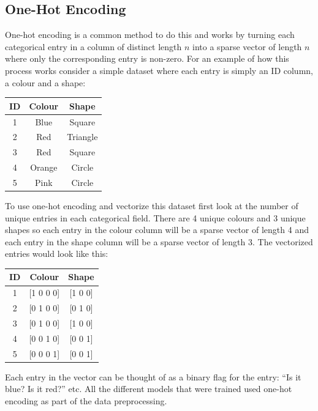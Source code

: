 \documentclass[a4paper,11pt]{article}
\begin{document}
\subsection{One-Hot Encoding}
One-hot encoding is a common method to do this and works by turning each categorical entry in a column of distinct length $n$ into a sparse vector of length $n$ where only the corresponding entry is non-zero. For an example of how this process works consider a simple dataset where each entry is simply an ID column, a colour and a shape:
\begin{center}
\begin{tabular}{ |c|c|c| } 
 \hline
 ID & Colour & Shape \\ \hline
 1 & Blue & Square \\
 2 & Red & Triangle \\
 3 & Red & Square \\
 4 & Orange & Circle \\
 5 & Pink & Circle \\
 \hline
\end{tabular}
\end{center}
To use one-hot encoding and vectorize this dataset first look at the number of unique entries in each categorical field. There are 4 unique colours and 3 unique shapes so each entry in the colour column will be a sparse vector of length 4 and each entry in the shape column will be a sparse vector of length 3. The vectorized  entries would look like this:
\begin{center}
\begin{tabular}{ |c|c|c| } 
 \hline
 ID & Colour & Shape \\ \hline
 1 & [1 0 0 0] & [1 0 0] \\
 2 & [0 1 0 0] & [0 1 0] \\
 3 & [0 1 0 0] & [1 0 0] \\
 4 & [0 0 1 0] & [0 0 1] \\
 5 & [0 0 0 1] & [0 0 1] \\
 \hline
\end{tabular}
\end{center}
Each entry in the vector can be thought of as a binary flag for the entry: ``Is it blue? Is it red?'' etc. All the different models that were trained used one-hot encoding as part of the data preprocessing.
\end{document}

